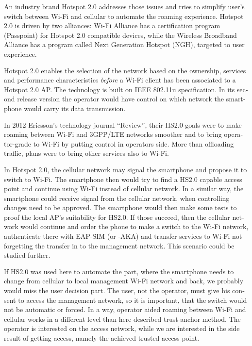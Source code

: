 \documentclass[12pt,a4paper,english]{tutthesis}
\begin{document}
\begin{otherlanguage}{english}
An industry brand  Hotspot 2.0 addresses those issues and tries to
simplify user's switch between Wi-Fi and cellular to automate the
roaming experience.  Hotspot 2.0 is driven by two alliances:
Wi-Fi Alliance has a certification program (Passpoint)
for Hotspot 2.0 compatible devices, while the Wireless Broadband
Alliance has a program called Next Generation Hotspot (NGH), targeted
to user experience\cite{wba-ngh}.

Hotspot 2.0
enables the selection of the network based on the ownership, services and
performance characteristics \emph{before} a Wi-Fi client has been associated
to a Hotspot 2.0 AP. The technology is built on IEEE 802.11u specification. 
In its second release version the operator would
have control on which network the smartphone would carry its data
transmission. 





In 2012 Ericsson's technology journal ``Review'', their 
HS2.0 goals were to make roaming between Wi-Fi and 3GPP/LTE networks smoother
and to bring operator-grade to Wi-Fi by putting control in operators side. More
than offloading traffic, plans were to bring other services also to Wi-Fi.\cite{er-seamless}

In Hotspot 2.0, the cellular network may signal the smartphone and
propose it to switch to Wi-Fi. The smartphone then would try to find a HS2.0 capable
access point and continue using Wi-Fi instead of cellular network.
In a similar way, the smartphone could receive signal from the cellular
network, when controlling changes need to be approved. The smartphone
would then make some tests to proof the local AP's suitability for 
HS2.0. If those succeed, then the cellular network would continue and order the 
phone to make a switch to the Wi-Fi network, authenticate there with 
EAP-SIM (or -AKA) and transfer services to Wi-Fi not forgetting 
the transfer in to the management network. This scenario could be 
studied further.


If HS2.0 was used here to automate the part, where
the smartphone needs to change from cellular to local
management Wi-Fi network and back, we probably would
miss the user decision part. The user, not the operator,
 must give his consent to access the management network, so
it is important, that the switch would not be automatic or forced.
In a way, operator aided roaming between Wi-Fi and cellular
works in a different level than here described trust-anchor method.
The operator is interested on the access network, while
we are interested in the side result of getting access, namely 
the achieved trusted access point.



\end{otherlanguage}
\end{document}
